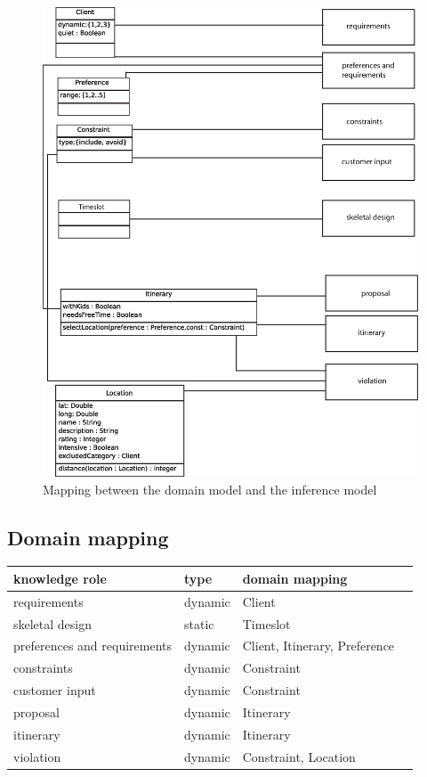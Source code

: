 \documentclass[11pt]{article} %
\begin{document}
\begin{figure}[h]
\centering
\includegraphics[width=\textwidth]{images/dom_VS_inference.eps}
\caption{Mapping between the domain model and the inference model}
\label{fig:MappingDomainInference}
\end{figure}


\subsection{Domain mapping}

\noindent
\begin{tabularx}{\textwidth}{| X | X | X | X |}
\hline 
knowledge role & type & domain mapping
\\ \hline \hline
requirements    &   dynamic  & Client
\\ \hline
skeletal design  & static    & Timeslot
\\ \hline
preferences and requirements  & dynamic    & Client, Itinerary, Preference
\\ \hline
constraints  & dynamic    & Constraint
\\ \hline
customer input  & dynamic    & Constraint
\\ \hline
proposal  & dynamic    & Itinerary
\\ \hline
itinerary  & dynamic    & Itinerary
\\ \hline
violation  & dynamic    & Constraint, Location %
\\ \hline
\end{tabularx}
\end{document}
